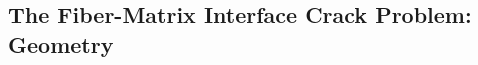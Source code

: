\documentclass[first,firstsupp,lastsupp,last,hyperref,table]{ETHclass}
\begin{document}

\subsection[Geometry]{The Fiber-Matrix Interface Crack Problem: Geometry}
\end{document}

